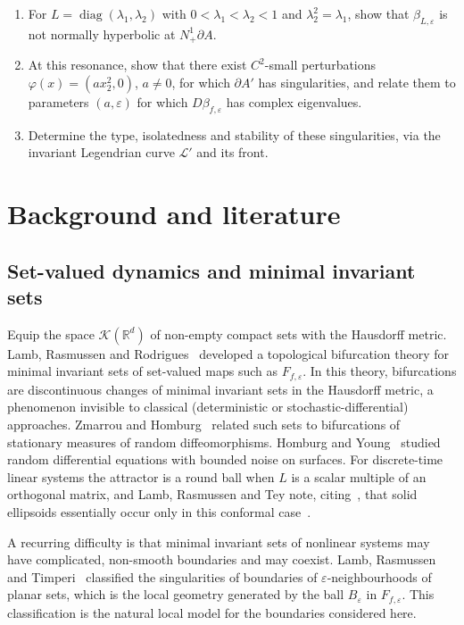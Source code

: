 \documentclass[11pt,a4paper]{article}
\theoremstyle{definition}
\theoremstyle{remark}
\newcommand{\R}{\mathbb{R}}
\newcommand{\eps}{\varepsilon}
\newcommand{\Nb}{N^1_+\partial A}
\DeclareMathOperator{\diag}{diag}
\begin{document}
\begin{enumerate}[label=\textbf{Task \arabic*.},leftmargin=*]
  \item For $L=\diag(\lambda_1,\lambda_2)$ with $0<\lambda_1<\lambda_2<1$ and $\lambda_2^2=\lambda_1$, show that
  $\beta_{L,\eps}$ is not normally hyperbolic at $\Nb$.
  \item At this resonance, show that there exist $C^2$-small perturbations $\varphi(x)=(ax_2^2,0)$, $a\neq0$, for which
  $\partial A'$ has singularities, and relate them to parameters $(a,\eps)$ for which $D\beta_{f,\eps}$ has complex eigenvalues.
  \item Determine the type, isolatedness and stability of these singularities, via the invariant Legendrian curve
  $\mathcal{L}'$ and its front.
\end{enumerate}


\section{Background and literature}\label{sec:background}

\subsection{Set-valued dynamics and minimal invariant sets}
Equip the space $\mathcal{K}(\R^d)$ of non-empty compact sets with the Hausdorff metric. Lamb, Rasmussen and
Rodrigues~\cite{LRR15} developed a topological bifurcation theory for minimal invariant sets of set-valued maps such as
$F_{f,\eps}$. In this theory, bifurcations are discontinuous changes of minimal invariant sets in the Hausdorff
metric, a phenomenon invisible to classical (deterministic or stochastic-differential) approaches. Zmarrou and
Homburg~\cite{ZH07} related such sets to bifurcations of stationary measures of random diffeomorphisms. Homburg and
Young~\cite{HY10} studied random differential equations with bounded noise on surfaces. For discrete-time linear
systems the attractor is a round ball when $L$ is a scalar multiple of an orthogonal matrix, and Lamb, Rasmussen and
Tey note, citing~\cite{HY10}, that solid ellipsoids essentially occur only in this conformal case~\cite{LRT23}.

A recurring difficulty is that minimal invariant sets of nonlinear systems may have complicated, non-smooth boundaries
and may coexist. Lamb, Rasmussen and Timperi~\cite{LRTi20a,LRTi20b} classified the singularities of boundaries of
$\eps$-neighbourhoods of planar sets, which is the local geometry generated by the ball $B_\eps$ in $F_{f,\eps}$. This
classification is the natural local model for the boundaries considered here.
\end{document}
